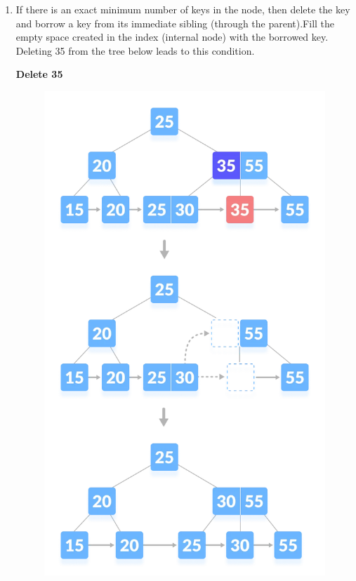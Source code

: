 \documentclass{article}
\begin{document}
\begin{itemize}
\begin{enumerate}
\begin{figure}[ht]
            \end{figure}
            \newpage
            \item If there is an exact minimum number of keys in the node, then delete the key and borrow a key from its immediate sibling (through the parent).Fill the empty space created in the index (internal node) with the borrowed key. Deleting 35 from the tree below leads to this condition.\\ 
            \begin{center}
                 \color{red}\textbf{Delete 35}
            \end{center}
            \begin{figure}[ht]
                \centering \includegraphics[scale = 0.4]{Images/deletion-4.png}
            \end{figure}
            

\end{enumerate}
\end{itemize}
\end{document}
